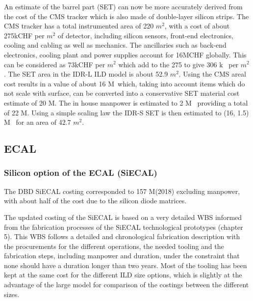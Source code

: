 An estimate of the barrel part (SET) can now be more accurately derived from the cost of the CMS tracker which is also made of double-layer silicon strips. The CMS tracker has a total instrumented area of 220 $m^2$, with a cost of about 275kCHF per $m^2$ of detector, including silicon sensors, front-end electronics, cooling and cabling as well as mechanics. The ancillaries such as back-end electronics, cooling plant and power supplies account for 16MCHF globally. This can be considered  as 73kCHF per $m^2$ which add to the 275 to give 306 k\texteuro~ per $m^2$.
The SET area in the IDR-L ILD model is about 52.9 $m^2$. Using the CMS areal cost results in a value of about 16 M\texteuro~which, taking into account items which do not scale with surface, can be converted into a conservative SET material cost estimate of 20 M\texteuro. The in house manpower is estimated to 2 M\texteuro~ providing a total of 22 M\texteuro.
Using a simple scaling law the IDR-S SET is then estimated to (16, 1.5) M\texteuro~ for an area of 42.7 $m^2$. 

\subsection{ECAL}
\subsubsection{Silicon option of the ECAL (SiECAL)}
The DBD SiECAL costing corresponded to 157 M\texteuro(2018) excluding manpower, with about half of the cost due to the silicon diode matrices.

The updated costing of the SiECAL is based on a very detailed WBS informed from the fabrication processes of the SiECAL technological prototypes (chapter 5). This WBS follows a detailed and chronological fabrication description with the procurements for the different operations, the needed tooling and the fabrication steps, including manpower and duration, under the constraint that none should have a duration longer than two years. Most of the tooling has been kept at the same cost for the different ILD size options, which is slightly at the advantage of the large model for comparison of the costings between the different sizes.

